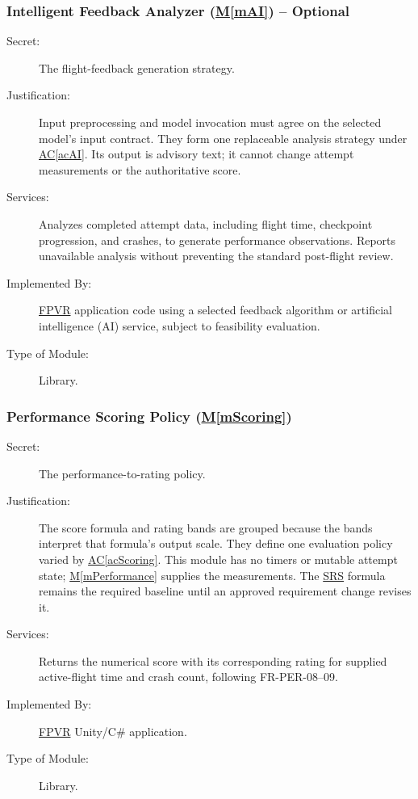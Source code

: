 \documentclass[12pt, titlepage]{article}
\DeclareRobustCommand{\mgabbr}[2]{\hyperlink{mg-abbr:#1}{#2}}
\newcommand{\acref}[1]{\mgabbr{ac}{AC}\ref{#1}}
\newcommand{\mref}[1]{\hyperref[#1]{M\ref*{#1}}}
\begin{document}
\subsubsection{Intelligent Feedback Analyzer
(\mref{mAI}) -- Optional}

\begin{description}

\item[Secret:]
The flight-feedback generation strategy.

\item[Justification:]
Input preprocessing and model invocation must agree on the selected
model's input contract. They form one replaceable analysis strategy under
\acref{acAI}. Its output is advisory text; it cannot change attempt
measurements or the authoritative score.

\item[Services:]
Analyzes completed attempt data, including flight time,
checkpoint progression, and crashes, to generate
performance observations. Reports unavailable analysis
without preventing the standard post-flight review.

\item[Implemented By:]
\mgabbr{fpvr}{FPVR} application code using a selected feedback
algorithm or artificial intelligence (AI) service, subject to feasibility
evaluation.

\item[Type of Module:]
Library.

\end{description}



\subsubsection{Performance Scoring Policy (\mref{mScoring})}

\begin{description}
\item[Secret:]
The performance-to-rating policy.

\item[Justification:]
The score formula and rating bands are grouped because the bands interpret
that formula's output scale. They define one evaluation policy varied by
\acref{acScoring}. This module has no timers or mutable attempt state;
\mref{mPerformance} supplies the measurements. The \mgabbr{srs}{SRS} formula
remains the
required baseline until an approved requirement change revises it.

\item[Services:]
Returns the numerical score with its corresponding rating for supplied
active-flight time and crash count, following FR-PER-08--09.

\item[Implemented By:]
\mgabbr{fpvr}{FPVR} Unity/C\# application.

\item[Type of Module:]
Library.
\end{description}
\end{document}
